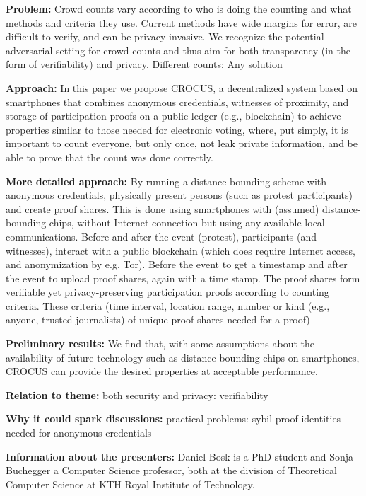 



\textbf{Problem:}
Crowd counts vary according to who is doing the counting and what
methods and criteria they use. Current methods have wide margins for
error, are difficult to verify, and can be privacy-invasive. We
recognize the potential adversarial setting for crowd counts and thus
aim for both transparency (in the form of verifiability) and
privacy. Different counts: Any solution 

\textbf{Approach:}
 In this paper we propose CROCUS, a decentralized system based on
 smartphones that combines anonymous credentials, witnesses of
 proximity, and storage of participation proofs on a public ledger
 (e.g., blockchain) to achieve properties similar to those needed for
 electronic voting, where, put simply, it is important to count
 everyone, but only once, not leak private information, and be able to
 prove that the count was done correctly. 


\textbf{More detailed approach:} 
By running a distance bounding scheme with anonymous credentials,
physically present persons (such as protest participants) and create proof
shares. This is done using smartphones with (assumed)
distance-bounding chips, without Internet connection but using any
available local communications. Before and after the event (protest), participants (and
witnesses), interact with a public blockchain (which does require
Internet access, and anonymization by e.g. Tor). Before the event to get
a timestamp and after the event to upload proof shares, again with a
time stamp. The proof shares form verifiable yet privacy-preserving
participation proofs according to counting criteria. These criteria
(time interval, location range, number or kind (e.g., anyone, trusted
journalists) of unique proof shares
needed for a proof)

\textbf{Preliminary results:} We find that, with some
 assumptions about the availability of future technology such as
 distance-bounding chips on smartphones, CROCUS can provide the
 desired properties at acceptable performance.

\textbf{Relation to theme:} both security and privacy: verifiability


\textbf{Why it could spark discussions:}
practical problems: sybil-proof identities needed for anonymous
credentials

\textbf{Information about the presenters:} Daniel Bosk is a PhD
student and Sonja Buchegger a Computer Science professor, both at the
division of Theoretical Computer Science at KTH Royal Institute of
Technology. 